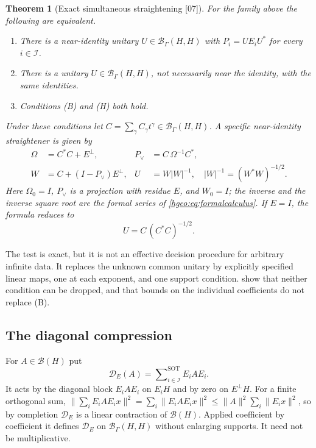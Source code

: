 \documentclass[11pt,letterpaper]{article}
\numberwithin{equation}{section}
\newtheorem{theorem}{Theorem}[section]
\theoremstyle{definition}
\theoremstyle{remark}
\newcommand{\BH}{\mathscr B_\Gamma(H,H)}
\newcommand{\norm}[1]{\lVert #1\rVert}
\newcommand{\abs}[1]{\lvert #1\rvert}
\newcommand{\src}[1]{\textup{\textsf{\small[#1]}}}
\newcommand{\sSOT}{\mathop{\sum}\nolimits^{\mathrm{SOT}}}
\newcommand{\Dg}{\mathscr D}
\begin{document}
\begin{theorem}[Exact simultaneous straightening \src{07}]
\label{hgeo:us:thm:main}
For the family above the following are equivalent.
\begin{enumerate}[label=\textup{(\roman*)}]
\item There is a near-identity unitary $U\in\BH$ with $P_i=UE_iU^*$ for every
$i\in\mathcal I$.
\item There is a unitary $U\in\BH$, not necessarily near the identity, with
the same identities.
\item Conditions \textup{(B)} and \textup{(H)} both hold.
\end{enumerate}
Under these conditions let $C=\sum_\gamma C_\gamma t^\gamma\in\BH$. A
specific near-identity straightener is given by
\begin{align}
 \Omega&=C^*C+E^\perp, & P_\vee&=C\,\Omega^{-1}C^*,
 \label{hgeo:us:eq:constructiona}\\
 W&=C+(I-P_\vee)E^\perp, & U&=W\abs{W}^{-1},\quad
 \abs{W}^{-1}=(W^*W)^{-1/2}.
 \label{hgeo:us:eq:constructionb}
\end{align}
Here $\Omega_0=I$, $P_\vee$ is a projection with residue $E$, and $W_0=I$;
the inverse and the inverse square root are the formal series of
\eqref{hgeo:eq:formalcalculus}. If $E=I$, the formula reduces to
\begin{equation}\label{hgeo:us:eq:polar}
 U=C\,(C^*C)^{-1/2}.
\end{equation}
\end{theorem}

The test is exact, but it is not an effective decision procedure for
arbitrary infinite data. It replaces the unknown common unitary by explicitly
specified linear maps, one at each exponent, and one support condition.
 show that neither condition
can be dropped, and that bounds on the individual coefficients do not
replace (B).

\subsection{The diagonal compression}
For $A\in\mathcal B(H)$ put
\[
 \Dg_E(A)=\sSOT_{i\in\mathcal I}E_iAE_i .
\]
It acts by the diagonal block $E_iAE_i$ on $E_iH$ and by zero on $E^\perp H$.
For a finite orthogonal sum,
$\norm{\sum_iE_iAE_ix}^2=\sum_i\norm{E_iAE_ix}^2\le\norm A^2\sum_i\norm{E_ix}^2$,
so by completion $\Dg_E$ is a linear contraction of $\mathcal B(H)$. Applied
coefficient by coefficient it defines $\Dg_E$ on $\BH$ without enlarging
supports. It need not be multiplicative.
\end{document}
